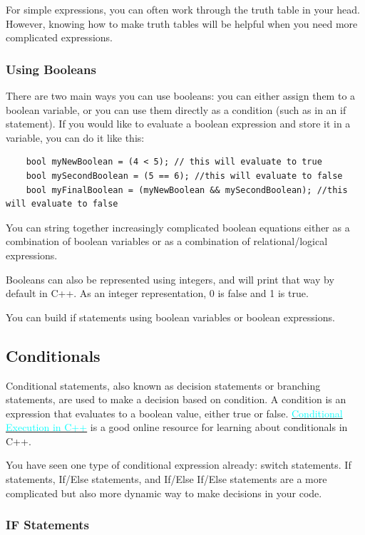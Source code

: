 For simple expressions, you can often work through the truth table in your head. However, knowing how to make truth tables will be helpful when you need more complicated expressions.

\subsubsection{Using Booleans}
There are two main ways you can use booleans: you can either assign them to a boolean variable, or you can use them directly as a condition (such as in an if statement). If you would like to evaluate a boolean expression and store it in a variable, you can do it like this:

\begin{verbatim}
    bool myNewBoolean = (4 < 5); // this will evaluate to true
    bool mySecondBoolean = (5 == 6); //this will evaluate to false
    bool myFinalBoolean = (myNewBoolean && mySecondBoolean); //this will evaluate to false
\end{verbatim}

You can string together increasingly complicated boolean equations either as a combination of boolean variables or as a combination of relational/logical expressions.

Booleans can also be represented using integers, and will print that way by default in C++. As an integer representation, 0 is false and 1 is true. 

You can build if statements using boolean variables or boolean expressions.

\subsection{Conditionals}
Conditional statements, also known as decision statements or branching statements, are used to make a decision based on condition. A condition is an expression that evaluates to a boolean value, either true or false. \href{https://cal-linux.com/tutorials/conditionals.html}{\textcolor{cyan}{Conditional Execution in C++}} is a good online resource for learning about conditionals in C++.

You have seen one type of conditional expression already: switch statements. If statements, If/Else statements, and If/Else If/Else statements are a more complicated but also more dynamic way to make decisions in your code.

\subsubsection{IF Statements} 


